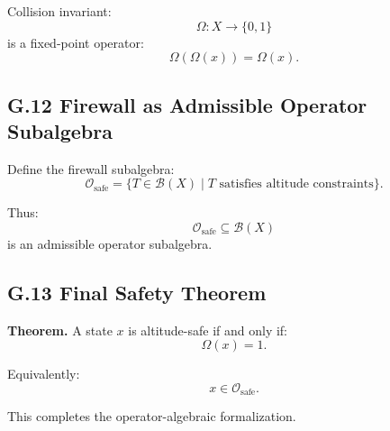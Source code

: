 Collision invariant:
\[
\Omega : X \to \{0,1\}
\]
is a fixed-point operator:
\[
\Omega(\Omega(x)) = \Omega(x).
\]

\subsection*{G.12 Firewall as Admissible Operator Subalgebra}

Define the firewall subalgebra:
\[
\mathcal{O}_{\mathrm{safe}} =
\{ T \in \mathcal{B}(X) \mid T \text{ satisfies altitude constraints} \}.
\]

Thus:
\[
\mathcal{O}_{\mathrm{safe}} \subseteq \mathcal{B}(X)
\]
is an admissible operator subalgebra.

\subsection*{G.13 Final Safety Theorem}

\textbf{Theorem.}  
A state $x$ is altitude-safe if and only if:
\[
\Omega(x)=1.
\]

Equivalently:
\[
x \in \mathcal{O}_{\mathrm{safe}}.
\]

This completes the operator-algebraic formalization.
